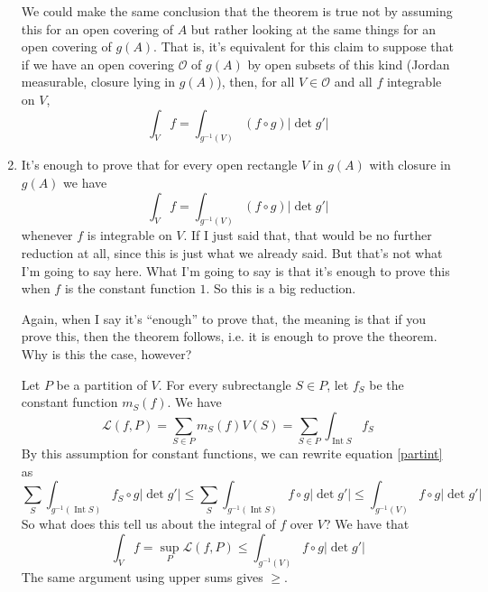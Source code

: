 \documentclass{article}
\DeclareMathOperator{\Int}{Int}
\newcommand{\mc}[1]{\mathcal{#1}}
\begin{document}
\begin{enumerate}
  We could make the same conclusion that the theorem is true not by assuming this for an open covering of \(A\) but rather looking at the same things for an open covering of \(g(A)\). That is, it's equivalent for this claim to suppose that if we have an open covering \(\mc{O}\) of \(g(A)\) by open subsets of this kind (Jordan measurable, closure lying in \(g(A)\)), then, for all \(V \in \mc{O}\) and all \(f\) integrable on \(V\),
  \begin{equation}
    \int_Vf = \int_{g^{-1}(V)}(f \circ g)|\det g'|
  \end{equation}

  \item It's enough to prove that for every open rectangle \(V\) in \(g(A)\) with closure in \(g(A)\) we have
  \begin{equation}
    \int_Vf = \int_{g^{-1}(V)}(f \circ g)|\det g'|
  \end{equation}
  whenever \(f\) is integrable on \(V\). If I just said that, that would be no further reduction at all, since this is just what we already said. But that's not what I'm going to say here. What I'm going to say is that it's enough to prove this when \(f\) is the constant function \(1\). So this is a big reduction.

  Again, when I say it's ``enough'' to prove that, the meaning is that if you prove this, then the theorem follows, i.e. it is enough to prove the theorem. Why is this the case, however?

  Let \(P\) be a partition of \(V\). For every subrectangle \(S \in P\), let \(f_S\) be the constant function \(m_S(f)\). We have
  \begin{equation}
    \mc{L}(f, P) = \sum_{S \in P}m_S(f)V(S) = \sum_{S \in P}\int_{\Int S}f_S
    \label{partint}
  \end{equation}
  By this assumption for constant functions, we can rewrite equation \ref{partint} as
  \begin{equation}
    \sum_{S}\int_{g^{-1}(\Int S)}f_S \circ g|\det g'| \leq \sum_{S}\int_{g^{-1}(\Int S)}f \circ g|\det g'| \leq \int_{g^{-1}(V)}f \circ g|\det g'|
  \end{equation}
  So what does this tell us about the integral of \(f\) over \(V\)? We have that
  \begin{equation}
    \int_Vf = \sup_P\mc{L}(f, P) \leq \int_{g^{-1}(V)}f \circ g|\det g'|
  \end{equation}
  The same argument using upper sums gives \(\geq\).


\end{enumerate}
\end{document}
